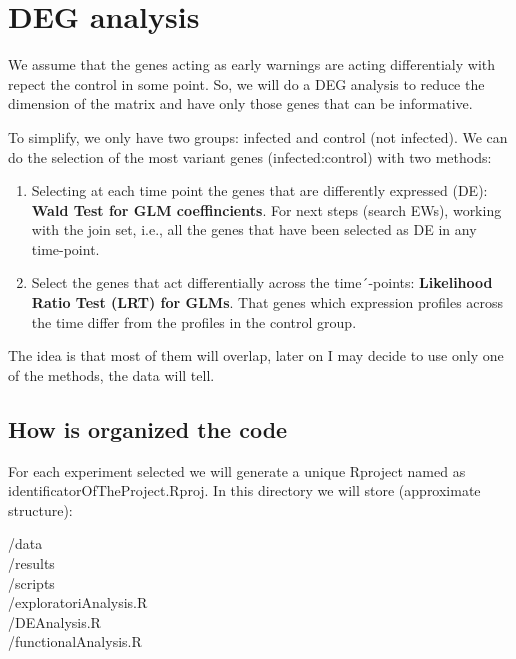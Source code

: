 \documentclass[
]{book}
\begin{document}
\hypertarget{deg-analysis}{%
\chapter{DEG analysis}\label{deg-analysis}}

We assume that the genes acting as early warnings are acting differentialy with repect the control in some point. So, we will do a DEG analysis to reduce the dimension of the matrix and have only those genes that can be informative.

To simplify, we only have two groups: infected and control (not infected). We can do the selection of the most variant genes (infected:control) with two methods:

\begin{enumerate}
\def\labelenumi{\arabic{enumi})}
\item
  Selecting at each time point the genes that are differently expressed (DE): \textbf{Wald Test for GLM coeffincients}. For next steps (search EWs), working with the join set, i.e., all the genes that have been selected as DE in any time-point.
\item
  Select the genes that act differentially across the time´-points: \textbf{Likelihood Ratio Test (LRT) for GLMs}. That genes which expression profiles across the time differ from the profiles in the control group.
\end{enumerate}

The idea is that most of them will overlap, later on I may decide to use only one of the methods, the data will tell.

\hypertarget{how-is-organized-the-code}{%
\section{How is organized the code}\label{how-is-organized-the-code}}

For each experiment selected we will generate a unique Rproject named as identificatorOfTheProject.Rproj. In this directory we will store (approximate structure):

/data\\
/results\\
/scripts\\
\hspace*{0.333em}\hspace*{0.333em}\hspace*{0.333em}\hspace*{0.333em}\hspace*{0.333em}/exploratoriAnalysis.R\\
\hspace*{0.333em}\hspace*{0.333em}\hspace*{0.333em}\hspace*{0.333em}\hspace*{0.333em}/DEAnalysis.R\\
\hspace*{0.333em}\hspace*{0.333em}\hspace*{0.333em}\hspace*{0.333em}\hspace*{0.333em}/functionalAnalysis.R
\end{document}
